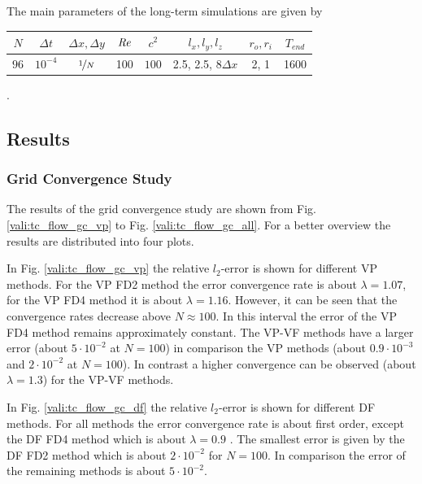 The main parameters of the long-term simulations are  given by

\begin{center}
\vspace*{0.7ex}
\begin{tabular}{c|c|c|c|c|c|c|c }
 $ N  $                   & $\Delta t$ & $\Delta x, \Delta y$            & $\mbox{\textit{Re}}$  & $c^2$   & $l_x, l_y, l_z$ &$r_o, r_i$ & $T_{end}$\\
\hline
 $96 $& $10^{-4}$ & $\nicefrac{1}{N}$ & 100     & $100$   & 2.5, 2.5, 8$\Delta x$   & 2, 1& 1600\\
\end{tabular}.
\vspace*{0.7ex}
\end{center}

\clearpage

\subsection{Results}

\subsubsection{Grid Convergence Study}


The results of the grid convergence study are shown from Fig. \ref{vali:tc_flow_gc_vp} to Fig. \ref{vali:tc_flow_gc_all}.
For a better overview the results are distributed into four plots.

In Fig. \ref{vali:tc_flow_gc_vp} the relative $l_2$-error is shown for different VP methods.
For the VP FD2 method the error convergence rate is about $\lambda=1.07$,
for the VP FD4 method it is about $\lambda=1.16$. However, it can be seen that the convergence rates decrease above $N\approx100$.
In this interval the error of the VP FD4 method remains approximately constant.
The VP-VF methods have a larger error (about $5\cdot 10^{-2}$ at $N=100$) in comparison the VP methods (about $0.9 \cdot 10^{-3}$ and  $2\cdot10^{-2}$ at $N=100$).
In contrast a higher convergence can be observed (about $\lambda=1.3$) for the VP-VF methods.

In Fig. \ref{vali:tc_flow_gc_df} the relative $l_2$-error is shown for different DF methods.
For all methods the error convergence rate is about first order, except the DF FD4 method which is about $\lambda=0.9$ .
The smallest error is given by the DF FD2 method which is about $2 \cdot 10^{-2}$ for $N=100$.
In comparison the error of the remaining methods is about $5\cdot10^{-2}$.

